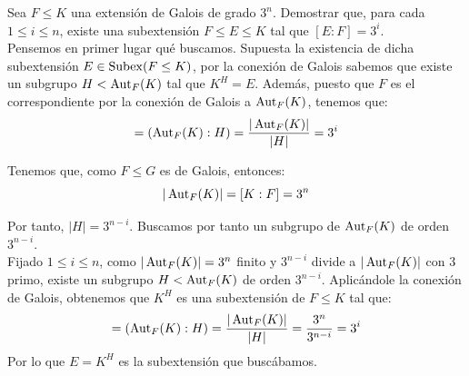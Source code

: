\begin{ejercicio}
    Sea $F\leq K$ una extensión de Galois de grado $3^n$. Demostrar que, para cada $1\leq i \leq n$, existe una subextensión $F\leq E \leq K$ tal que $[E:F] = 3^i$.\\

    Pensemos en primer lugar qué buscamos. Supuesta la existencia de dicha subextensión $E\in \operatorname{Subex}(F\leq K)$, por la conexión de Galois sabemos que existe un subgrupo $H< \operatorname{Aut}_F(K)$ tal que $K^H = E$. Además, puesto que $F$ es el correspondiente por la conexión de Galois a $\operatorname{Aut}_F(K)$, tenemos que:
    \begin{equation*}
        [E:F] = (\Aut_F(K):H) = \dfrac{|\Aut_F(K)|}{|H|} = 3^i
    \end{equation*}

    Tenemos que, como $F\leq G$ es de Galois, entonces:
    \begin{equation*}
        |\operatorname{Aut}_F(K)| = [K:F] = 3^n
    \end{equation*}

    Por tanto, $|H| = 3^{n-i}$. Buscamos por tanto un subgrupo de $\operatorname{Aut}_F(K)$ de orden $3^{n-i}$.\\

    
    Fijado $1\leq i \leq n$, como $|\operatorname{Aut}_F(K)| = 3^n$ finito y $3^{n-i}$ divide a $|\operatorname{Aut}_F(K)|$ con $3$ primo, existe un subgrupo $H<\operatorname{Aut}_F(K)$ de orden $3^{n-i}$. Aplicándole la conexión de Galois, obtenemos que $K^H$ es una subextensión de $F\leq K$ tal que:
    \begin{equation*}
        [K^H:F] = (\Aut_F(K):H) = \dfrac{|\Aut_F(K)|}{|H|} = \dfrac{3^n}{3^{n-i}} = 3^i
    \end{equation*}
    Por lo que $E = K^H$ es la subextensión que buscábamos.
\end{ejercicio}

